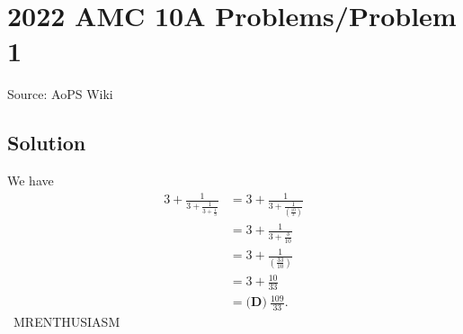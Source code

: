 \documentclass[12pt]{article}
\begin{document}
\section*{{2022 AMC 10A Problems/Problem 1}}
Source: AoPS Wiki

\subsection*{Solution}
We have \begin{align*} 3+\frac{1}{3+\frac{1}{3+\frac13}} &= 3+\frac{1}{3+\frac{1}{\left(\frac{10}{3}\right)}} \\ &= 3+\frac{1}{3+\frac{3}{10}} \\ &= 3+\frac{1}{\left(\frac{33}{10}\right)} \\ &= 3+\frac{10}{33} \\ &= \boxed{\textbf{(D)}\ \frac{109}{33}}. \end{align*} ~MRENTHUSIASM
\end{document}
